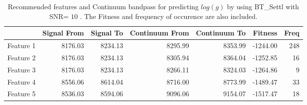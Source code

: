\begin{table}
\begin{center}
\begin{tabular}{rrrrrrr}
  \hline
 & Signal From & Signal To & Continuum From & Continuum To & Fitness & Freq \\ 
  \hline
Feature 1 & 8176.03 & 8234.13 & 8295.99 & 8353.99 & -1244.00 & 248 \\ 
  Feature 2 & 8176.03 & 8234.13 & 8305.94 & 8364.04 & -1252.85 &  16 \\ 
  Feature 3 & 8176.03 & 8234.13 & 8266.11 & 8324.03 & -1264.86 &   9 \\ 
  Feature 4 & 8556.06 & 8614.04 & 8716.00 & 8773.99 & -1489.47 &  33 \\ 
  Feature 5 & 8536.03 & 8594.06 & 9096.06 & 9154.07 & -1517.47 &  18 \\ 
   \hline
\end{tabular}
\caption {Recommended features and Continuum bandpass for predicting $log(g)$ 
      by using BT\_Settl with SNR= $ 10 $ . 
      The Fitness and frequency of occurence are also included.} \label{tab:tab_SNR10_G} 
\end{center}
\end{table}

